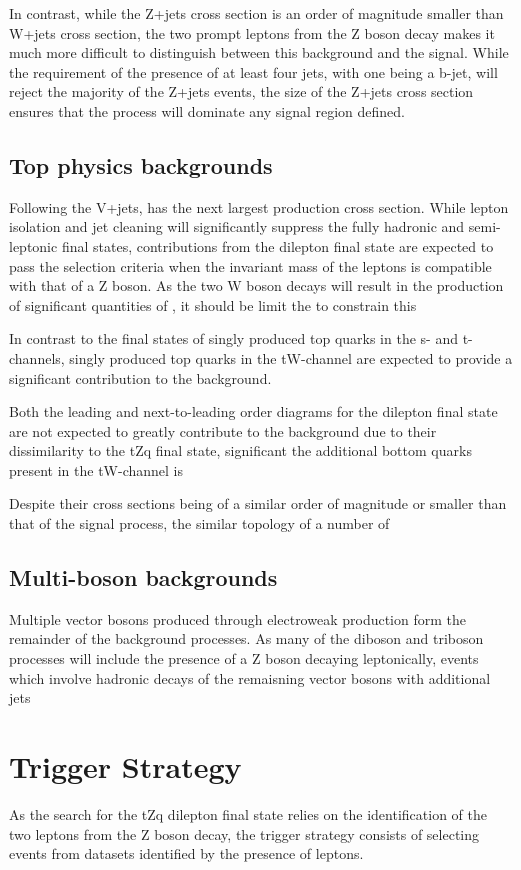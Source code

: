 In contrast, while the Z+jets cross section is an order of magnitude smaller than W+jets cross section, the two prompt leptons from the Z boson decay makes it much more difficult to distinguish between this background and the signal.
While the requirement of the presence of at least four jets, with one being a b-jet, will reject the majority of the Z+jets events, the size of the Z+jets cross section ensures that the process will dominate any signal region defined.

\subsection{Top physics backgrounds}
Following the V+jets, \ttbar has the next largest production cross section.
While lepton isolation and jet cleaning will significantly suppress the fully hadronic and semi-leptonic \ttbar final states, 
contributions from the dilepton final state are expected to pass the selection criteria when the invariant mass of the leptons is compatible with that of a Z boson.
As the two W boson decays will result in the production of significant quantities of \MET, it should be limit the  to constrain this 

In contrast to the final states of singly produced top quarks in the s- and t-channels, singly produced top quarks in the tW-channel are expected to provide a significant contribution to the background.

Both the leading and next-to-leading order diagrams for the dilepton final state 
are not expected to greatly contribute to the background due to their dissimilarity to the tZq final state, significant 
the additional bottom quarks present in the  tW-channel is 

Despite their cross sections being of a similar order of magnitude or smaller than that of the signal process, the similar topology of a number of 

\ttZ
\subsection{Multi-boson backgrounds}
Multiple vector bosons produced through electroweak production form the remainder of the background processes.
As many of the diboson and triboson processes will include the presence of a Z boson decaying leptonically, events which involve hadronic decays of the remaisning vector bosons with additional jets 

\section{Trigger Strategy}\label{sec:triggerStrategy}
As the search for the tZq dilepton final state relies on the identification of the two leptons from the Z boson decay, the trigger strategy consists of selecting events from datasets identified by the presence of leptons.


